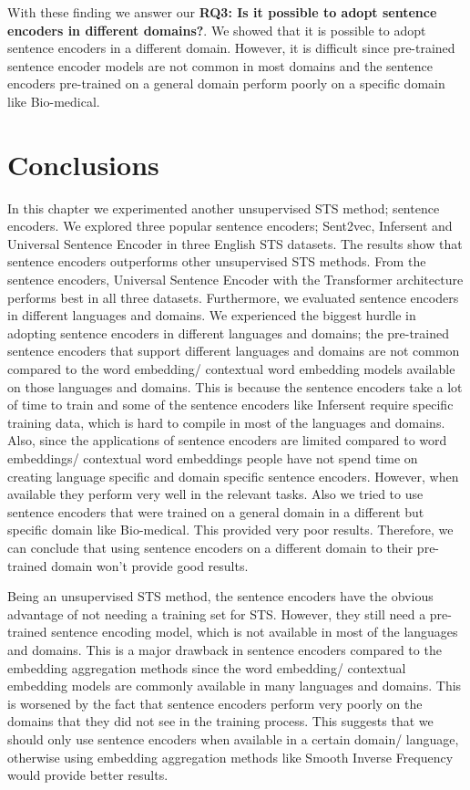 With these finding we answer our \textbf{RQ3: Is it possible to adopt sentence encoders in different domains?}. We showed that it is possible to adopt sentence encoders in a different domain. However, it is difficult since pre-trained sentence encoder models are not common in most domains and the sentence encoders pre-trained on a general domain perform poorly on a specific domain like Bio-medical. 

\section{Conclusions}
\label{sec:sentence_conclusions}
In this chapter we experimented another unsupervised STS method; sentence encoders. We explored three popular sentence encoders; Sent2vec, Infersent and Universal Sentence Encoder in three English STS datasets. The results show that sentence encoders outperforms other unsupervised STS methods. From the sentence encoders, Universal Sentence Encoder with the Transformer architecture performs best in all three datasets. Furthermore, we evaluated sentence encoders in different languages and domains. We experienced the biggest hurdle in adopting sentence encoders in different languages and domains; the pre-trained sentence encoders that support different languages and domains are not common compared to the word embedding/ contextual word embedding models available on those languages and domains. This is because the sentence encoders take a lot of time to train and some of the sentence encoders like Infersent require specific training data, which is hard to compile in most of the languages and domains. Also, since the applications of sentence encoders are limited compared to word embeddings/ contextual word embeddings people have not spend time on creating language specific and domain specific sentence encoders. However, when available they perform very well in the relevant tasks. Also we tried to use sentence encoders that were trained on a general domain in a different but specific domain like Bio-medical. This provided very poor results. Therefore, we can conclude that using sentence encoders on a different domain to their pre-trained domain won't provide good results.


Being an unsupervised STS method, the sentence encoders have the obvious advantage of not needing a training set for STS. However, they still need a pre-trained sentence encoding model, which is not available in most of the languages and domains. This is a major drawback in sentence encoders compared to the embedding aggregation methods since the word embedding/ contextual embedding models are commonly available in many languages and domains. This is worsened by the fact that sentence encoders perform very poorly on the domains that they did not see in the training process. This suggests that we should only use sentence encoders when available in a certain domain/ language, otherwise using embedding aggregation methods like Smooth Inverse Frequency would provide better results. 


